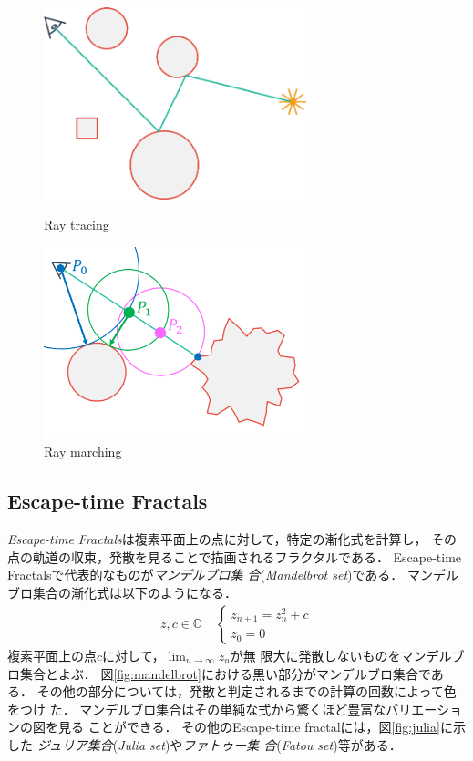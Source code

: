  \begin{figure}[htbp]
  \begin{minipage}{0.5\hsize}
   \center
   \includegraphics[width=3in, keepaspectratio]{../img/fractal/raytrace.pdf}
   \caption{Ray tracing}
   \label{fig:raytrace}
  \end{minipage}
  \begin{minipage}{0.5\hsize}
   \center
   \includegraphics[width=3in, keepaspectratio]{../img/fractal/raymarching.pdf}
   \caption{Ray marching}
   \label{fig:raymarch}
  \end{minipage}
 \end{figure}

\subsection{Escape-time Fractals}

\textit{Escape-time Fractals}は複素平面上の点に対して，特定の漸化式を計算し，
その点の軌道の収束，発散を見ることで描画されるフラクタルである．
Escape-time Fractalsで代表的なものが\emph{マンデルブロ集
合}(\textit{Mandelbrot set})である．
マンデルブロ集合の漸化式は以下のようになる．
\begin{align*}
 z, c \in \mathbb{C} \quad
 \begin{cases}
  z_{n+1} = z^2_{n} + c \\ z_0 = 0
 \end{cases}
\end{align*}
複素平面上の点$c$に対して，$\displaystyle \lim_{n \to \infty} z_n$が無
限大に発散しないものをマンデルブロ集合とよぶ．
図\ref{fig:mandelbrot}における黒い部分がマンデルブロ集合である．
その他の部分については，発散と判定されるまでの計算の回数によって色をつけ
た．
マンデルブロ集合はその単純な式から驚くほど豊富なバリエーションの図を見る
ことができる．
その他のEscape-time fractalには，図\ref{fig:julia}に示した
\emph{ジュリア集合}(\textit{Julia set})や\emph{ファトゥー集
合}(\textit{Fatou set})等がある．

